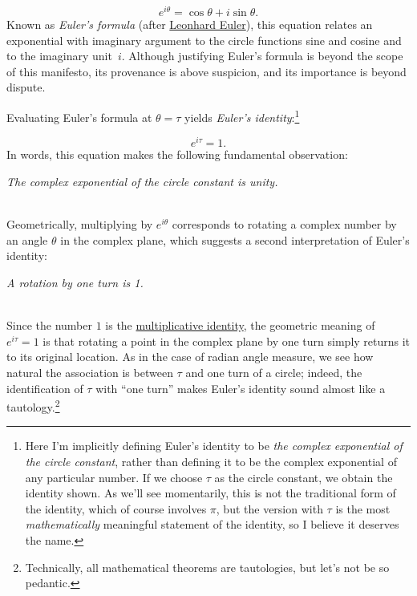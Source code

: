 \documentclass{article}
\begin{document}
\[ e^{i\theta} = \cos\theta + i\sin\theta. \]
Known as \emph{Euler's formula} (after \href{http://en.wikipedia.org/wiki/Leonhard_Euler}{Leonhard Euler}), this equation relates an exponential with imaginary argument to the circle functions sine and cosine and to the imaginary unit~$i$. Although justifying Euler's formula is beyond the scope of this manifesto, its provenance is above suspicion, and its importance is beyond dispute.

Evaluating Euler's formula at $\theta = \tau$ yields \emph{Euler's identity}:\footnote{Here I'm implicitly defining Euler's identity to be \emph{the complex exponential of the circle constant}, rather than defining it to be the complex exponential of any particular number. If we choose $\tau$ as the circle constant, we obtain the identity shown. As we'll see momentarily, this is not the traditional form of the identity, which of course involves $\pi$, but the version with $\tau$ is the most \emph{mathematically} meaningful statement of the identity, so I believe it deserves the name.}

\[ e^{i\tau} = 1. \]
In words, this equation makes the following fundamental observation: 

\begin{center}
\emph{The complex exponential of the circle constant is unity.}
\end{center} 

\\

Geometrically, multiplying by $e^{i\theta}$ corresponds to rotating a complex number by an angle $\theta$ in the complex plane, which suggests a second interpretation of Euler's identity:

\begin{center}
\emph{A rotation by one turn is 1.}
\end{center}

\\

\noindent Since the number $1$ is the \href{http://en.wikipedia.org/wiki/Identity_element}{multiplicative identity}, the geometric meaning of $e^{i\tau} = 1$ is that rotating a point in the complex plane by one turn simply returns it to its original location. As in the case of radian angle measure, we see how natural the association is between $\tau$ and one turn of a circle; indeed, the identification of $\tau$ with ``one turn'' makes Euler's identity sound almost like a tautology.\footnote{Technically, all mathematical theorems are tautologies, but let's not be so pedantic.}
\end{document}
